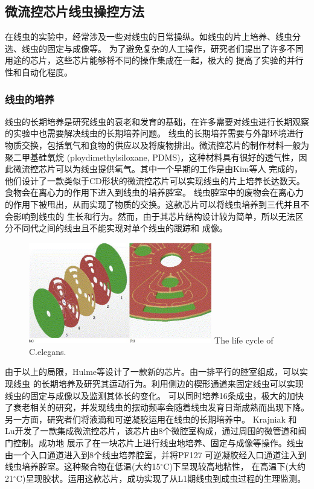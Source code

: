 \subsection{微流控芯片线虫操控方法}
	在线虫的实验中，经常涉及一些对线虫的日常操纵。如线虫的片上培养、线虫分选、线虫的固定与成像等。
	为了避免复杂的人工操作，研究者们提出了许多不同用途的芯片，这些芯片能够将不同的操作集成在一起，极大的
	提高了实验的并行性和自动化程度。
	
\subsubsection{线虫的培养}
\label{sec:intro:analog}
	线虫的长期培养是研究线虫的衰老和发育的基础，在许多需要对线虫进行长期观察的实验中也需要解决线虫的长期培养问题。
	线虫的长期培养需要与外部环境进行物质交换，包括氧气和食物的供应以及将废物排出。微流控芯片的制作材料一般为聚二甲基硅氧烷
	(ploydimethylsiloxane, PDMS)，这种材料具有很好的透气性，因此微流控芯片可以为线虫提供氧气。其中一个早期的工作是由Kim等人\cite{Kim2007Automated}
	完成的，他们设计了一款类似于CD形状的微流控芯片可以实现线虫的片上培养长达数天。食物会在离心力的作用下进入到线虫的培养腔室。
	线虫腔室中的废物会在离心力的作用下被甩出，从而实现了物质的交换。这款芯片可以将线虫培养到三代并且不会影响到线虫的
	生长和行为。然而，由于其芯片结构设计较为简单，所以无法区分不同代之间的线虫且不能实现对单个线虫的跟踪和
	成像。
	\begin{figure}[h]
	  \centering
	  \includegraphics[width=8cm]{figure/chap1/cd.jpg}
		{The life cycle of C.elegans.}
	  \label{fig:cd}
	\end{figure}
	
	由于以上的局限，Hulme等\cite{Hulme2010Lifespan}设计了一款新的芯片。由一排平行的腔室组成，可以实现线虫
	的长期培养及研究其运动行为。利用侧边的楔形通道来固定线虫可以实现线虫的固定与成像以及监测其体长的变化。
	可以同时培养16条成虫，极大的加快了衰老相关的研究，并发现线虫的摆动频率会随着线虫发育日渐成熟而出现下降。
	另一方面，研究者们将液滴和可逆凝胶运用在线虫的长期培养中\cite{Aubry2015Hydrogel,Krajniak2010Long,Wen2015A,Cornaglia2016Automated}。
	Krajniak 和 Lu\cite{Krajniak2010Long}开发了一款集成微流控芯片，该芯片由8个微腔室构成，通过周围的微管道和阀门控制。成功地
	展示了在一块芯片上进行线虫地培养、固定与成像等操作。线虫由一个入口通道进入到8个线虫培养腔室，并将PF127
	可逆凝胶经入口通道注入到线虫培养腔室。这种聚合物在低温(大约15$^\circ$C)下呈现较高地粘性，
	在高温下(大约21$^\circ$C)呈现胶状。运用这款芯片，成功实现了从L1期线虫到成虫过程的生理监测。
